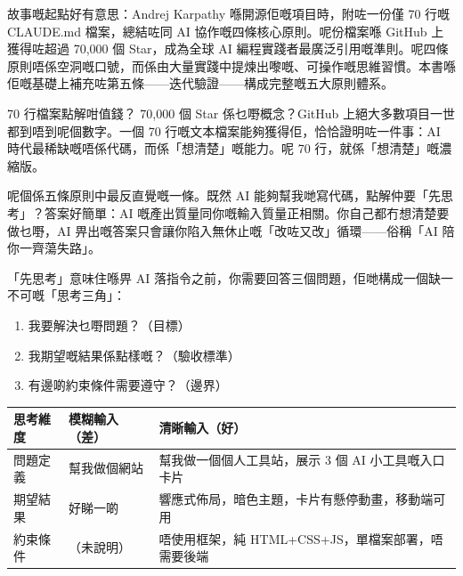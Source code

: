 

故事嘅起點好有意思：Andrej Karpathy 喺開源佢嘅項目時，附咗一份僅 70 行嘅 CLAUDE.md 檔案，總結咗同 AI 協作嘅四條核心原則。呢份檔案喺 GitHub 上獲得咗超過 70,000 個 Star，成為全球 AI 編程實踐者最廣泛引用嘅準則。呢四條原則唔係空洞嘅口號，而係由大量實踐中提煉出嚟嘅、可操作嘅思維習慣。本書喺佢嘅基礎上補充咗第五條——迭代驗證——構成完整嘅五大原則體系。

\begin{tcbinfo}{70 行檔案點解咁值錢？}
70,000 個 Star 係乜嘢概念？GitHub 上絕大多數項目一世都到唔到呢個數字。一個 70 行嘅文本檔案能夠獲得佢，恰恰證明咗一件事：AI 時代最稀缺嘅唔係代碼，而係「想清楚」嘅能力。呢 70 行，就係「想清楚」嘅濃縮版。

\end{tcbinfo}


呢個係五條原則中最反直覺嘅一條。既然 AI 能夠幫我哋寫代碼，點解仲要「先思考」？答案好簡單：AI 嘅產出質量同你嘅輸入質量正相關。你自己都冇想清楚要做乜嘢，AI 畀出嘅答案只會讓你陷入無休止嘅「改咗又改」循環——俗稱「AI 陪你一齊蕩失路」。

「先思考」意味住喺畀 AI 落指令之前，你需要回答三個問題，佢哋構成一個缺一不可嘅「思考三角」：

\begin{enumerate}
  \item 我要解決乜嘢問題？（目標）
  \item 我期望嘅結果係點樣嘅？（驗收標準）
  \item 有邊啲約束條件需要遵守？（邊界）
\end{enumerate}

\begin{center}
\begin{tabularx}{\linewidth}{|X|X|X|}
\hline
\textbf{思考維度} & \textbf{模糊輸入（差）} & \textbf{清晰輸入（好）} \tabularnewline
\hline
問題定義 & 幫我做個網站 & 幫我做一個個人工具站，展示 3 個 AI 小工具嘅入口卡片 \tabularnewline
期望結果 & 好睇一啲 & 響應式佈局，暗色主題，卡片有懸停動畫，移動端可用 \tabularnewline
約束條件 & （未說明） & 唔使用框架，純 HTML+CSS+JS，單檔案部署，唔需要後端 \tabularnewline
\hline
\end{tabularx}
\end{center}

